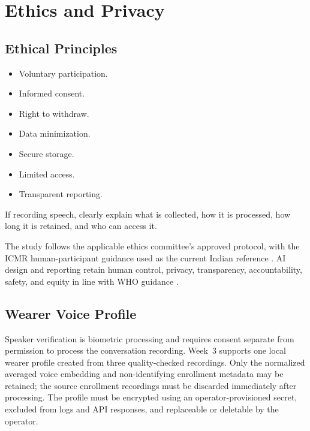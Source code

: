 \section{Ethics and Privacy}
\label{sec:ethics-privacy}

\subsection{Ethical Principles}
\label{sec:ethical-principles}

\begin{itemize}
    \item Voluntary participation.
    \item Informed consent.
    \item Right to withdraw.
    \item Data minimization.
    \item Secure storage.
    \item Limited access.
    \item Transparent reporting.
\end{itemize}

\begin{requirementbox}
If recording speech, clearly explain what is collected, how it is processed, how long it is retained, and who can access it.
\end{requirementbox}

The study follows the applicable ethics committee's approved protocol, with the ICMR human-participant guidance used as the current Indian reference \cite{icmr_ethics_2017}. AI design and reporting retain human control, privacy, transparency, accountability, safety, and equity in line with WHO guidance \cite{who_ai_ethics_2021}.

\subsection{Wearer Voice Profile}
\label{sec:wearer-voice-profile-privacy}

Speaker verification is biometric processing and requires consent separate from permission to process the conversation recording. Week~3 supports one local wearer profile created from three quality-checked recordings. Only the normalized averaged voice embedding and non-identifying enrollment metadata may be retained; the source enrollment recordings must be discarded immediately after processing. The profile must be encrypted using an operator-provisioned secret, excluded from logs and API responses, and replaceable or deletable by the operator.


